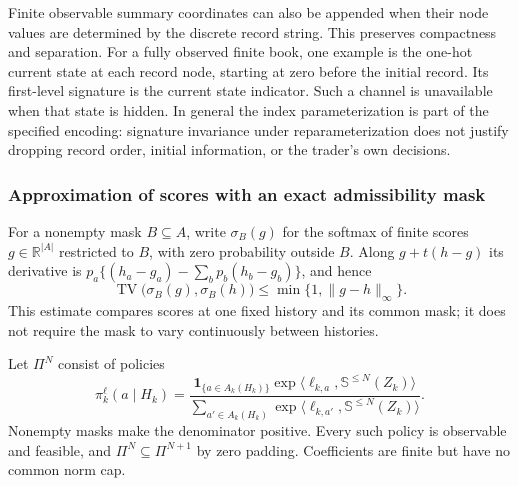 \documentclass[11pt]{article}
\numberwithin{equation}{section}
\theoremstyle{definition}
\theoremstyle{remark}
\newcommand{\R}{\mathbb{R}}
\theoremstyle{definition}
\newcommand{\TV}{\operatorname{TV}}
\begin{document}
Finite observable summary coordinates can also be appended when their node
values are determined by the discrete record string. This preserves
compactness and separation. For a fully observed finite book, one example
is the one-hot current state at each record node, starting at zero before
the initial record. Its first-level signature is the current state indicator.
Such a channel is unavailable when that state is hidden. In general the
index parameterization is part of the specified encoding: signature
invariance under reparameterization does not justify dropping record order,
initial information, or the trader's own decisions.

\subsubsection*{Approximation of scores with an exact admissibility mask}

For a nonempty mask $B\subseteq A$, write $\sigma_B(g)$ for the softmax
of finite scores $g\in\R^{|A|}$ restricted to $B$, with zero probability
outside $B$. Along $g+t(h-g)$ its derivative is
$p_a\{(h_a-g_a)-\sum_b p_b(h_b-g_b)\}$, and hence
\begin{equation}\label{eq:maskedlipschitz}
 \TV\bigl(\sigma_B(g),\sigma_B(h)\bigr)
 \le \min\{1,\|g-h\|_\infty\}.
\end{equation}
This estimate compares scores at one fixed history and its common mask;
it does not require the mask to vary continuously between histories.

Let $\Pi^N$ consist of policies
\begin{equation}\label{eq:sigsoftmax}
 \pi_k^\ell(a\mid H_k)=
 \frac{\mathbf1_{\{a\in A_k(H_k)\}}
  \exp\langle\ell_{k,a},\mathbb S^{\le N}(Z_k)\rangle}
 {\sum_{a'\in A_k(H_k)}
  \exp\langle\ell_{k,a'},\mathbb S^{\le N}(Z_k)\rangle}.
\end{equation}
Nonempty masks make the denominator positive. Every such policy is
observable and feasible, and $\Pi^N\subseteq\Pi^{N+1}$ by zero padding.
Coefficients are finite but have no common norm cap.
\end{document}

